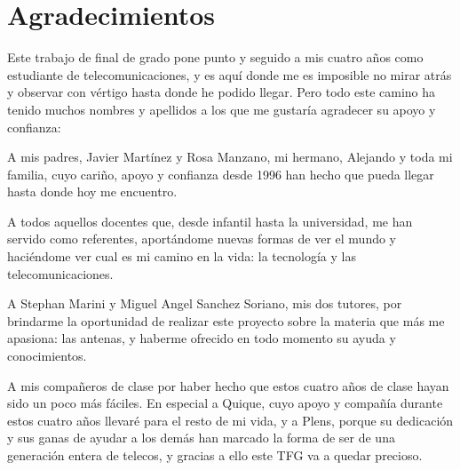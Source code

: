 

\cleardoublepage %
\chapter*{Agradecimientos}

\thispagestyle{empty}
\vspace{1cm}

\par Este trabajo de final de grado pone punto y seguido a mis cuatro años como estudiante de telecomunicaciones, y es aquí donde me es imposible no mirar atrás y observar con vértigo hasta donde he podido llegar.
Pero todo este camino ha tenido muchos nombres y apellidos a los que me gustaría agradecer su apoyo y confianza:

\par A mis padres, Javier Martínez y Rosa Manzano, mi hermano, Alejando y toda mi familia, cuyo cariño, apoyo y confianza desde 1996 han hecho que pueda llegar hasta donde hoy me encuentro.



\par A todos aquellos docentes que, desde infantil hasta la universidad, me han servido como referentes, aportándome nuevas formas de ver el mundo y haciéndome ver cual es mi camino en la vida: la tecnología y las telecomunicaciones.




\par A Stephan Marini y Miguel Angel Sanchez Soriano, mis dos tutores, por brindarme la oportunidad de realizar este proyecto sobre la materia que más me apasiona: las antenas, y haberme ofrecido en todo momento su ayuda y conocimientos.




\par A mis compañeros de clase por haber hecho que estos cuatro años de clase hayan sido un poco más fáciles. En especial a Quique, cuyo apoyo y compañía durante estos cuatro años llevaré para el resto de mi vida, y a Plens, porque su dedicación y sus ganas de ayudar a los demás han marcado la forma de ser de una generación entera de telecos, y gracias a ello este TFG va a quedar precioso. 




